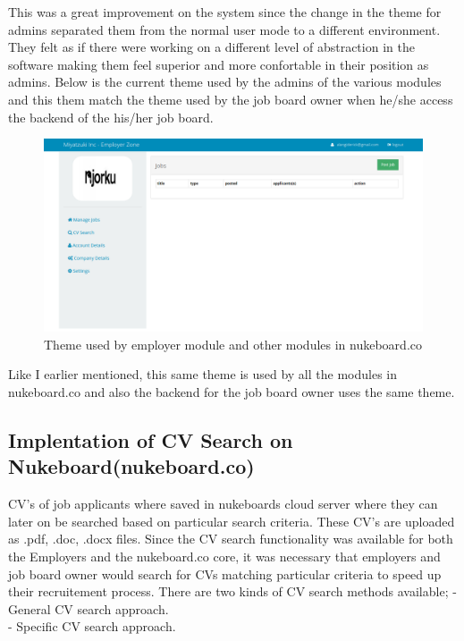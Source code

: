 This was a great improvement on the system since the change in the theme for admins separated them from the normal user mode to a different environment. They felt as if there were working on a different level of abstraction in the software making them feel superior and more confortable in their position as admins. Below is the current theme used by the admins of the various modules and this them match the theme used by the job board owner when he/she access the backend of the his/her job board.

\begin{figure}[h]
\centering
\includegraphics[width=13cm,scale=1.5]{Figures/ThemeEmployerModule}
\decoRule
\caption[Employer Module Theme]{Theme used by employer module and other modules in nukeboard.co}
\label{fig:Modules}
\end{figure} 

Like I earlier mentioned, this same theme is used by all the modules in nukeboard.co and also the backend for the job board owner uses the same theme.

\subsection{Implentation of CV Search on Nukeboard(nukeboard.co)}

CV's of job applicants where saved in nukeboards cloud server where they can later on be searched based on particular search criteria. These CV's are uploaded as .pdf, .doc, .docx files. Since the CV search functionality was available for both the Employers and the nukeboard.co core, it was necessary that employers and job board owner would search for CVs matching particular criteria to speed up their recruitement process. There are two kinds of CV search methods available;
- General CV search approach. \\
- Specific CV search approach. \\

